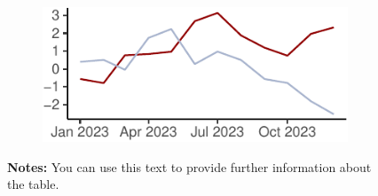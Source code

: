 \documentclass[12pt,a4paper,oneside]{article} %
\begin{document}
\begin{figure}

\caption{\label{fig-ts1}Displaying how things evolve over time}

{\centering 

\begin{figure}[H]

{\centering \includegraphics{example_paper_files/figure-pdf/tsplot1-1.pdf}

}

\end{figure}

\hypertarget{fig-ts1-1}{}
\vspace{-5pt}
\begin{minipage}{0.9\textwidth}
\scriptsize
\singlespacing
\textbf{Notes:} You can use this text to provide further information about the table. \lipsum[66]
\end{minipage}
\vspace{15pt}

}

\end{figure}

\lipsum[1-2]
\end{document}
